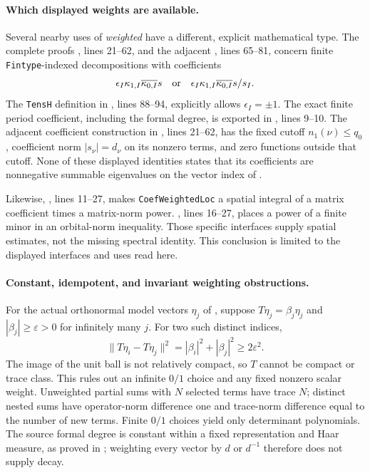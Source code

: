 \paragraph{Which displayed weights are available.}
Several nearby uses of \emph{weighted} have a different, explicit
mathematical type.  The complete proofs
,
lines 21--62, and the adjacent
, lines 65--81, concern finite
\texttt{Fintype}-indexed decompositions with coefficients
\[
 \epsilon_I\kappa_{1,I}\overline{\kappa_{0,I}}s
 \quad\hbox{or}\quad
 \epsilon_I\kappa_{1,I}\overline{\kappa_{0,I}}s/s_I.
\]
The \texttt{TensH} definition in
,
lines 88--94, explicitly allows \(\epsilon_I=\pm1\).
The exact finite period coefficient, including the formal degree,
is exported in
,
lines 9--10.  The adjacent coefficient construction in
,
lines 21--62, has the fixed cutoff \(n_1(\nu)\le q_0\), coefficient
norm \(|s_\nu|=d_\nu\) on its nonzero terms, and zero functions
outside that cutoff.  None of these displayed identities states
that its coefficients are nonnegative summable eigenvalues on
the vector index of .

Likewise,
,
lines 11--27, makes \texttt{CoefWeightedLoc} a spatial integral
of a matrix coefficient times a matrix-norm power.
,
lines 16--27, places a power of a finite minor in an orbital-norm
inequality.  Those specific interfaces supply spatial estimates,
not the missing spectral identity.  This conclusion is limited
to the displayed interfaces and uses read here.

\paragraph{Constant, idempotent, and invariant weighting obstructions.}
For the actual orthonormal model vectors \(\eta_j\) of
, suppose \(T\eta_j=\beta_j\eta_j\) and
\(|\beta_j|\ge\varepsilon>0\) for infinitely many \(j\).
For two such distinct indices,
\[
 \|T\eta_i-T\eta_j\|^2=|\beta_i|^2+|\beta_j|^2
 \ge2\varepsilon^2.
\]
The image of the unit ball is not relatively compact, so \(T\)
cannot be compact or trace class.  This rules out an infinite
\(0/1\) choice and any fixed nonzero scalar weight.
Unweighted partial sums with \(N\) selected terms have trace \(N\);
distinct nested sums have operator-norm difference one and
trace-norm difference equal to the number of new terms.
Finite \(0/1\) choices yield only determinant polynomials.
The source formal degree is constant within a fixed representation
and Haar measure, as proved in ; weighting every
vector by \(d\) or \(d^{-1}\) therefore does not supply decay.

